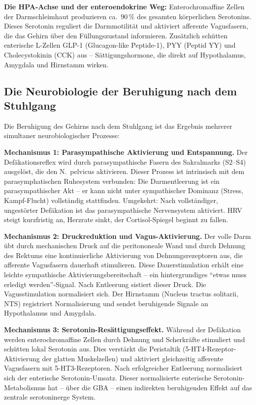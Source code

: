 ﻿\documentclass[12pt,a4paper]{report}
\theoremstyle{plain}
\theoremstyle{definition}
\theoremstyle{remark}
\begin{document}
	\textbf{Die HPA-Achse und der enteroendokrine Weg:}
	Enterochromaffine Zellen der Darmschleimhaut produzieren
	ca.\ $90\,\%$ des gesamten körperlichen Serotonins.
	Dieses Serotonin reguliert die Darmmotilität und
	aktiviert afferente Vagusfasern, die das Gehirn über
	den Füllungszustand informieren. Zusätzlich schütten
	enterische L-Zellen GLP-1 (Glucagon-like Peptide-1),
	PYY (Peptid YY) und Cholecystokinin (CCK) aus --
	Sättigungshormone, die direkt auf Hypothalamus,
	Amygdala und Hirnstamm wirken.

	\subsection{Die Neurobiologie der Beruhigung nach dem Stuhlgang}

	Die Beruhigung des Gehirns nach dem Stuhlgang ist
	das Ergebnis mehrerer simultaner neurobiologischer Prozesse:

	\textbf{Mechanismus 1: Parasympathische Aktivierung und Entspannung.}
	Der Defäkationsreflex wird durch parasympathische Fasern
	des Sakralmarks (S2--S4) ausgelöst, die den N.\ pelvicus aktivieren.
	Dieser Prozess ist intrinsisch mit dem parasymphatischen Ruhesystem
	verbunden: Die Darmentleerung ist ein parasympathischer Akt --
	er kann nicht unter sympathischer Dominanz (Stress, Kampf-Flucht)
	vollständig stattfinden. Umgekehrt: Nach vollständiger,
	ungestörter Defäkation ist das parasympathische Nervensystem
	aktiviert. HRV steigt kurzfristig an, Herzrate sinkt,
	der Cortisol-Spiegel beginnt zu fallen.

	\textbf{Mechanismus 2: Druckreduktion und Vagus-Aktivierung.}
	Der volle Darm übt durch mechanischen Druck auf die peritononeale
	Wand und durch Dehnung des Rektums eine kontinuierliche
	Aktivierung von Dehnungsrezeptoren aus, die afferente
	Vagusfasern dauerhaft stimulieren.
	Diese Dauerstimulation erhält eine leichte sympathische
	Aktivierungsbereitschaft -- ein hintergrundiges ``etwas muss
	erledigt werden''-Signal. Nach Entleerung sistiert dieser Druck.
	Die Vagusstimulation normalisiert sich. Der Hirnstamm
	(Nucleus tractus solitarii, NTS) registriert Normalisierung
	und sendet beruhigende Signale an Hypothalamus und Amygdala.

	\textbf{Mechanismus 3: Serotonin-Resättigungseffekt.}
	Während der Defäkation werden enterochromaffine Zellen
	durch Dehnung und Scherkräfte stimuliert und schütten
	lokal Serotonin aus. Dies verstärkt die Peristaltik
	(5-HT4-Rezeptor-Aktivierung der glatten Muskelzellen)
	und aktiviert gleichzeitig afferente Vagusfasern mit
	5-HT3-Rezeptoren.
	Nach erfolgreicher Entleerung normalisiert sich der
	enterische Serotonin-Umsatz.
	Dieser normalisierte enterische Serotonin-Metabolismus
	hat -- über die GBA -- einen indirekten beruhigenden
	Effekt auf das zentrale serotoninerge System.
\end{document}
